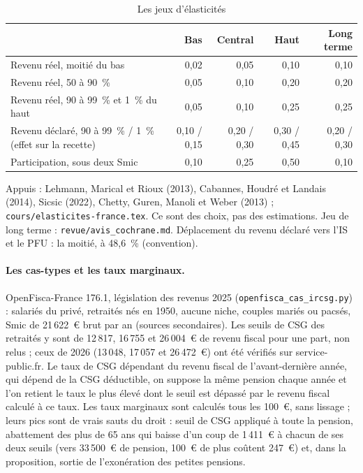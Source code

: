 \documentclass[11pt,a4paper]{article}
\begin{document}
\begin{table}[!htbp]\centering\scriptsize\setlength{\tabcolsep}{4pt}
\caption{Les jeux d'élasticités}\label{tab:ircsg_jeux}
\begin{tabular}{@{}lrrrr@{}}
\toprule
& Bas & Central & Haut & Long terme \\
\midrule
Revenu réel, moitié du bas & 0,02 & 0,05 & 0,10 & 0,10 \\
Revenu réel, 50 à 90~\% & 0,05 & 0,10 & 0,20 & 0,20 \\
Revenu réel, 90 à 99~\% et 1~\% du haut & 0,05 & 0,10 & 0,25 & 0,25 \\
Revenu déclaré, 90 à 99~\% / 1~\% (effet sur la recette) & 0,10 / 0,15 & 0,20 / 0,30 & 0,30 / 0,45 & 0,20 / 0,30 \\
Participation, sous deux Smic & 0,10 & 0,25 & 0,50 & 0,10 \\
\bottomrule
\end{tabular}
\par\vspace{3pt}\parbox{\linewidth}{\raggedright\scriptsize\color{encre}
Appuis : Lehmann, Marical et Rioux (2013), Cabannes, Houdré et Landais (2014), Sicsic (2022), Chetty, Guren, Manoli et
Weber (2013) ; \texttt{cours/elasticites-france.tex}. Ce sont des choix, pas des estimations. Jeu de long terme :
\texttt{revue/avis\_cochrane.md}. Déplacement du revenu déclaré vers l'IS et le PFU : la moitié, à 48,6~\%
(convention).}
\end{table}

\paragraph{Les cas-types et les taux marginaux.} OpenFisca-France 176.1, législation des revenus 2025
(\texttt{openfisca\_cas\_ircsg.py}) : salariés du privé, retraités nés en 1950, aucune niche, couples mariés ou pacsés,
Smic de 21\,622~€ brut par an (sources secondaires). Les seuils de CSG des retraités y sont de 12\,817, 16\,755 et
26\,004~€ de revenu fiscal pour une part, non relus ; ceux de 2026 (13\,048, 17\,057 et 26\,472~€) ont été vérifiés sur
service-public.fr. Le taux de CSG dépendant du revenu fiscal de l'avant-dernière année, qui dépend de la CSG déductible,
on suppose la même pension chaque année et l'on retient le taux le plus élevé dont le seuil est dépassé par le revenu
fiscal calculé à ce taux. Les taux marginaux sont calculés tous les 100~€, sans lissage ; leurs pics sont de vrais sauts
du droit : seuil de CSG appliqué à toute la pension, abattement des plus de 65 ans qui baisse d'un coup de 1\,411~€ à
chacun de ses deux seuils (vers 33\,500~€ de pension, 100~€ de plus coûtent 247~€) et, dans la proposition, sortie de
l'exonération des petites pensions.
\end{document}
